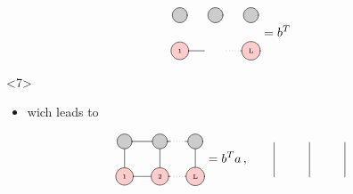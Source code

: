 \documentclass[aspectratio=169]{beamer}
\begin{document}
\begin{frame}
\begin{onlyenv}
\begin{equation}
\begin{tikzpicture}[baseline={([yshift=-.5ex]current bounding box.center)}]
        \draw[gray, thick] (0,-1) -- (0.7,-1);
        \draw[gray, dotted] (1.3,-1) -- (1.7,-1);
        \draw[gray, thick] (1.7,-1) -- (2.0,-1);
    
        \node[draw, circle, line cap=round, fill=black!20, minimum size=12] at (0,0) {  };
        \node[draw, circle, line cap=round, fill=black!20, minimum size=12] at (1,0) {  };
        \node[draw, circle, line cap=round, fill=black!20, minimum size=12] at (2,0) {  };
    
        \node[draw, circle, line cap=round, fill=red!20] at (0,-1) {\tiny 1};
        \node[draw, circle, line cap=round, fill=red!20] at (2,-1) {\tiny L};
      \end{tikzpicture} = b^T
    \end{equation}
  \end{onlyenv}
  \begin{onlyenv}<7>
    \begin{itemize}
      \item wich leads to
    \end{itemize}
    \begin{equation}
      \begin{tikzpicture}[baseline={([yshift=-.5ex]current bounding box.center)}]
        \draw[gray, thick] (0,0) -- (0,-1);
        \draw[gray, thick] (1,0) -- (1,-1);
        \draw[gray, thick] (2,0) -- (2,-1);
    
        \draw[gray, thick] (0,0) -- (1.3,0);
        \draw[gray, dotted] (1.3,0) -- (1.7,0);
        \draw[gray, thick] (1.7,0) -- (2.0,0);
    
        \draw[gray, thick] (0,-1) -- (1.3,-1);
        \draw[gray, dotted] (1.3,-1) -- (1.7,-1);
        \draw[gray, thick] (1.7,-1) -- (2.0,-1);
    
        \node[draw, circle, line cap=round, fill=black!20, minimum size=12] at (0,0) {  };
        \node[draw, circle, line cap=round, fill=black!20, minimum size=12] at (1,0) {  };
        \node[draw, circle, line cap=round, fill=black!20, minimum size=12] at (2,0) {  };
    
        \node[draw, circle, line cap=round, fill=red!20] at (0,-1) {\tiny 1};
        \node[draw, circle, line cap=round, fill=red!20] at (1,-1) {\tiny 2};
        \node[draw, circle, line cap=round, fill=red!20] at (2,-1) {\tiny L};
      \end{tikzpicture} = b^T a \thinspace , \qquad
      \begin{tikzpicture}[baseline={([yshift=-.5ex]current bounding box.center)}]
        \draw[gray, thick] (0,0) -- (0,-1);
        \draw[gray, thick] (1,0) -- (1,-1);
        \draw[gray, thick] (2,0) -- (2,-1);
      

\end{tikzpicture}
\end{equation}
\end{onlyenv}
\end{frame}
\end{document}
